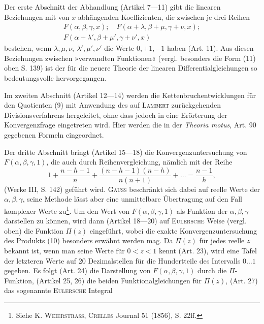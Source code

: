 \clearpage{}
\indent Der erste Abschnitt der Abhandlung (Artikel 7—11) gibt die linearen
Beziehungen mit von \(x\) abhängenden Koeffizienten, die zwischen je drei Reihen
\[
\begin{gathered}
F(\alpha,\beta,\gamma,x);\quad F(\alpha+\lambda,\beta+\mu,\gamma+\nu,x);\\
F(\alpha+\lambda',\beta+\mu',\gamma+\nu',x)
\end{gathered}
\]
bestehen, wenn \(\lambda,\mu,\nu,\ \lambda',\mu',\nu'\) die Werte \(0,+1,-1\) haben (Art. 11). Aus
diesen Beziehungen zwischen »verwandten Funktionen« (vergl. besonders die
Form (11) oben S. 139) ist der für die neuere Theorie der linearen Differentialgleichungen
so bedeutungsvolle  hervorgegangen.
\par
Im zweiten Abschnitt (Artikel 12—14) werden die Kettenbruchentwicklungen
für den Quotienten (9) mit Anwendung des auf \textsc{Lambert} zurückgehenden
Divisionsverfahrens hergeleitet, ohne dass jedoch in eine Erörterung der Konvergenzfrage
eingetreten wird. Hier werden die in der \textit{Theoria motus}, Art. 90
gegebenen Formeln eingeordnet.
\par
Der dritte Abschnitt bringt (Artikel 15—18) die Konvergenzuntersuchung\linebreak
von \(F(\alpha,\beta,\gamma,1)\), die auch durch Reihenvergleichung, nämlich mit der Reihe
\[
1+\frac{n-h-1}{n}+\frac{(n-h-1)(n-h)}{n(n+1)}+\ldots=\frac{n-1}{h},
\]
(Werke III, S. 142) geführt wird. \textsc{Gauss} beschränkt sich dabei auf reelle
Werte der \(\alpha,\beta,\gamma\), seine Methode lässt aber eine unmittelbare Übertragung
auf den Fall komplexer Werte zu\footnote{Siehe K. \textsc{Weierstrass}, \textsc{Crelles} Journal 51 (1856), S. 22ff.}. Um den Wert von \(F(\alpha,\beta,\gamma,1)\) als
Funktion der \(\alpha,\beta,\gamma\) darstellen zu können, wird dann (Artikel 18—20) auf
\textsc{Eulersche} Weise (vergl. oben) die Funktion \(\Pi(z)\) eingeführt, wobei die exakte
Konvergenzuntersuchung des Produkts (10) besonders erwähnt werden mag.
Da \(\Pi(z)\) für jedes reelle \(z\) bekannt ist, wenn man seine Werte für \(0<z<1\)
kennt (Art. 23), wird eine Tafel der letzteren Werte auf 20 Dezimalstellen
für die Hundertteile des Intervalls \(0\ldots1\) gegeben. Es folgt (Art. 24) die
Darstellung von \(F(\alpha,\beta,\gamma,1)\) durch die \(\Pi\)-Funktion, (Artikel 25, 26) die beiden
Funktionalgleichungen für \(\Pi(z)\), (Art. 27) das sogenannte \textsc{Eulersche} Integral
